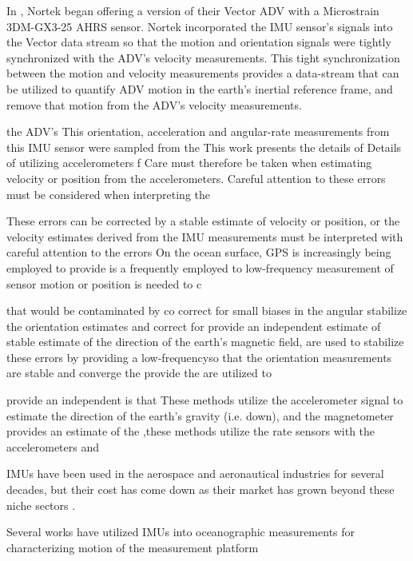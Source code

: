 In , Nortek began offering a version of their Vector ADV with a Microstrain 3DM-GX3-25 AHRS sensor. Nortek incorporated the IMU sensor's signals into the Vector data stream so that the motion and orientation signals were tightly synchronized with the ADV's velocity measurements. This tight synchronization between the motion and velocity measurements provides a data-stream that can be utilized to quantify ADV motion in the earth's inertial reference frame, and remove that motion from the ADV's velocity measurements.

 the ADV's This orientation, acceleration and angular-rate measurements from this IMU sensor were sampled from the 
This work presents the details of 
Details of utilizing accelerometers f Care must therefore be taken when estimating velocity or position from the accelerometers. Careful attention to these errors must be considered when interpreting the 

These errors can be corrected by a stable estimate of velocity or position, or the velocity estimates derived from the IMU measurements must be interpreted with careful attention to the errors  On the ocean surface, GPS is increasingly being employed to provide  is a frequently employed to low-frequency measurement of sensor motion or position is needed to c

that would be contaminated by  co correct for small biases in the angular stabilize the orientation estimates and correct for  provide an independent estimate of  stable estimate of the direction of the earth's magnetic field, are used to stabilize these errors by providing a low-frequencyso that the orientation measurements are stable and converge the provide  the are utilized to 

 provide an independent   is that These methods utilize the accelerometer signal to estimate the direction of the earth's gravity (i.e. down), and the magnetometer provides an estimate of the  ,these methods utilize the rate sensors with the accelerometers and 

IMUs have been used in the aerospace and aeronautical industries for several decades, but their cost has come down as their market has grown beyond these niche sectors \cite[]{Bevly2004}.

Several works have utilized IMUs into oceanographic measurements for characterizing motion of the measurement platform

